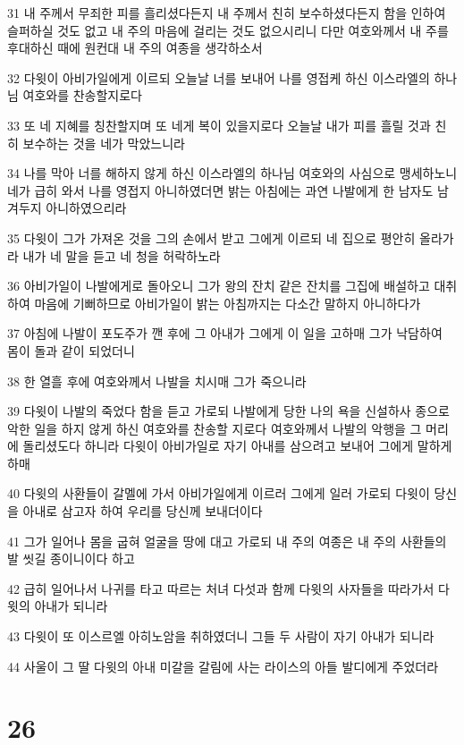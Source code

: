 \par 31 내 주께서 무죄한 피를 흘리셨다든지 내 주께서 친히 보수하셨다든지 함을 인하여 슬퍼하실 것도 없고 내 주의 마음에 걸리는 것도 없으시리니 다만 여호와께서 내 주를 후대하신 때에 원컨대 내 주의 여종을 생각하소서
\par 32 다윗이 아비가일에게 이르되 오늘날 너를 보내어 나를 영접케 하신 이스라엘의 하나님 여호와를 찬송할지로다
\par 33 또 네 지혜를 칭찬할지며 또 네게 복이 있을지로다 오늘날 내가 피를 흘릴 것과 친히 보수하는 것을 네가 막았느니라
\par 34 나를 막아 너를 해하지 않게 하신 이스라엘의 하나님 여호와의 사심으로 맹세하노니 네가 급히 와서 나를 영접지 아니하였더면 밝는 아침에는 과연 나발에게 한 남자도 남겨두지 아니하였으리라
\par 35 다윗이 그가 가져온 것을 그의 손에서 받고 그에게 이르되 네 집으로 평안히 올라가라 내가 네 말을 듣고 네 청을 허락하노라
\par 36 아비가일이 나발에게로 돌아오니 그가 왕의 잔치 같은 잔치를 그집에 배설하고 대취하여 마음에 기뻐하므로 아비가일이 밝는 아침까지는 다소간 말하지 아니하다가
\par 37 아침에 나발이 포도주가 깬 후에 그 아내가 그에게 이 일을 고하매 그가 낙담하여 몸이 돌과 같이 되었더니
\par 38 한 열흘 후에 여호와께서 나발을 치시매 그가 죽으니라
\par 39 다윗이 나발의 죽었다 함을 듣고 가로되 나발에게 당한 나의 욕을 신설하사 종으로 악한 일을 하지 않게 하신 여호와를 찬송할 지로다 여호와께서 나발의 악행을 그 머리에 돌리셨도다 하니라 다윗이 아비가일로 자기 아내를 삼으려고 보내어 그에게 말하게 하매
\par 40 다윗의 사환들이 갈멜에 가서 아비가일에게 이르러 그에게 일러 가로되 다윗이 당신을 아내로 삼고자 하여 우리를 당신께 보내더이다
\par 41 그가 일어나 몸을 굽혀 얼굴을 땅에 대고 가로되 내 주의 여종은 내 주의 사환들의 발 씻길 종이니이다 하고
\par 42 급히 일어나서 나귀를 타고 따르는 처녀 다섯과 함께 다윗의 사자들을 따라가서 다윗의 아내가 되니라
\par 43 다윗이 또 이스르엘 아히노암을 취하였더니 그들 두 사람이 자기 아내가 되니라
\par 44 사울이 그 딸 다윗의 아내 미갈을 갈림에 사는 라이스의 아들 발디에게 주었더라

\chapter{26}

